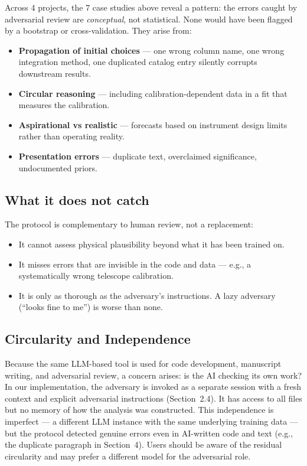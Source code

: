 \documentclass[twocolumn]{aastex631}
\begin{document}
Across 4 projects, the 7 case studies above reveal a pattern: the errors
caught by adversarial review are \emph{conceptual}, not statistical.  None
would have been flagged by a bootstrap or cross-validation.  They arise
from:
\begin{itemize}
  \item \textbf{Propagation of initial choices} --- one wrong column name,
        one wrong integration method, one duplicated catalog entry
        silently corrupts downstream results.
  \item \textbf{Circular reasoning} --- including calibration-dependent
        data in a fit that measures the calibration.
  \item \textbf{Aspirational vs realistic} --- forecasts based on
        instrument design limits rather than operating reality.
  \item \textbf{Presentation errors} --- duplicate text, overclaimed
        significance, undocumented priors.
\end{itemize}

\subsection{What it does not catch}

The protocol is complementary to human review, not a replacement:
\begin{itemize}
  \item It cannot assess physical plausibility beyond what it has been
        trained on.
  \item It misses errors that are invisible in the code and data ---
        e.g., a systematically wrong telescope calibration.
  \item It is only as thorough as the adversary's instructions.
        A lazy adversary (``looks fine to me'') is worse than none.
\end{itemize}

\subsection{Circularity and Independence}

Because the same LLM-based tool is used for code development, manuscript
writing, and adversarial review, a concern arises: is the AI checking its
own work?  In our implementation, the adversary is invoked as a separate
session with a fresh context and explicit adversarial instructions
(Section~2.4).  It has access to all files but no memory of how the
analysis was constructed.  This independence is imperfect --- a different
LLM instance with the same underlying training data --- but the protocol
detected genuine errors even in AI-written code and text (e.g., the
duplicate paragraph in Section~4).  Users should be aware of the
residual circularity and may prefer a different model for the adversarial
role.
\end{document}
